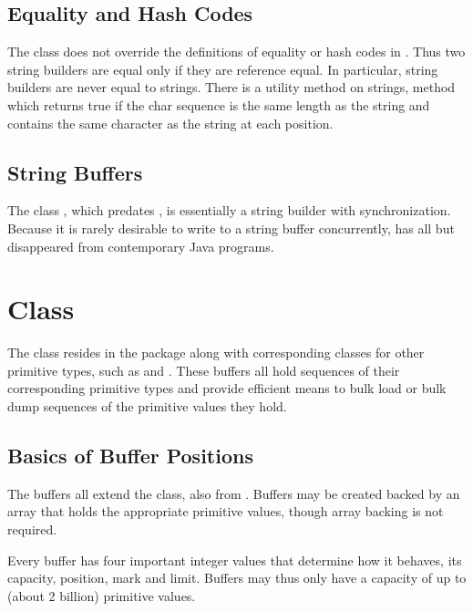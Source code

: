 \subsection{Equality and Hash Codes}

The  class does not override the definitions of
equality or hash codes in .  Thus two string builders are
equal only if they are reference equal.  In particular, string
builders are never equal to strings.  There is a utility method on
strings,  method which
returns true if the char sequence is the same length as the string and
contains the same character as the string at each position.

\subsection{String Buffers}

The class , which predates
, is essentially a string builder with
synchronization.  Because it is rarely desirable to write to a
string buffer concurrently,  has all but
disappeared from contemporary Java programs.


\section{ Class}\label{section:char-charbuffer}

The  class resides in the  package
along with corresponding classes for other primitive types, such as
 and .  These buffers all hold sequences
of their corresponding primitive types and provide efficient means to
bulk load or bulk dump sequences of the primitive values they hold.

\subsection{Basics of Buffer Positions}

The buffers all extend the  class, also from
.  Buffers may be created backed by an array that holds the appropriate
primitive values, though array backing is not required.

Every buffer has four important integer values that determine how it
behaves, its capacity, position, mark and limit.  Buffers may thus
only have a capacity of up to  (about 2
billion) primitive values.  

